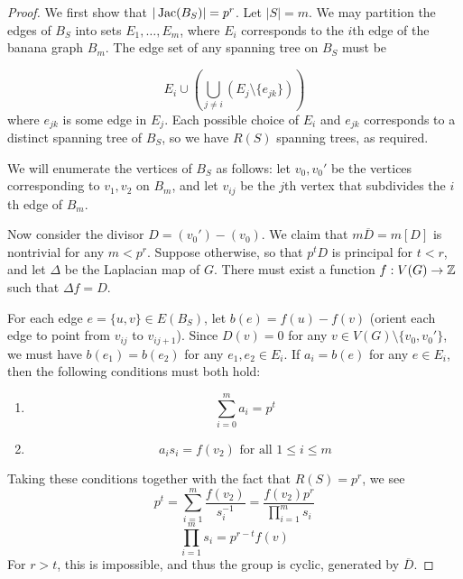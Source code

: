 \documentclass{amsart}
\begin{document}
\begin{proof}
  We first show that $|\operatorname{Jac}(B_S)| = p^r$. Let $|S| = m$. We may
  partition the edges of $B_S$ into sets $E_1, \ldots, E_m$, where
  $E_i$ corresponds to the $i$th edge of the banana graph $B_m$. The
  edge set of any spanning tree on $B_S$ must be

  \begin{equation*}
    E_i \cup \left(\bigcup_{j \ne i} (E_j \setminus \{e_{jk}\})\right)
  \end{equation*}
  where $e_{jk}$ is some edge in $E_j$. Each possible choice of $E_i$
  and $e_{jk}$ corresponds to a distinct spanning tree of $B_S$, so we
  have $R(S)$ spanning trees, as required.

  We will enumerate the vertices of $B_S$ as follows: let $v_0, v_0'$
  be the vertices corresponding to $v_1, v_2$ on $B_m$, and let
  $v_{ij}$ be the $j$th vertex that subdivides the $i$th edge of
  $B_m$.

  Now consider the divisor $D = (v_0') - (v_0)$. We claim that
  $m\overline{D} = m[D]$ is nontrivial for any $m < p^r$. Suppose
  otherwise, so that $p^tD$ is principal for $t < r$, and let $\Delta$
  be the Laplacian map of $G$. There must exist a function $f:V(G) \to
  \mathbb{Z}$ such that $\Delta f = D$.

  For each edge $e = \{u, v\} \in E(B_S)$, let $b(e) = f(u) - f(v)$
  (orient each edge to point from $v_{ij}$ to $v_{ij+1}$). Since $D(v)
  = 0$ for any $v \in V(G) \setminus \{v_0, v_0'\}$, we must have
  $b(e_1) = b(e_2)$ for any $e_1, e_2 \in E_i$.  If $a_i = b(e)$ for
  any $e \in E_i$, then the following conditions must both hold:
  
  \begin{enumerate}
    \item 
      \[
      \sum_{i=0}^m a_i = p^t
      \]
    \item
      \[
      a_is_i = f(v_2) \textrm{ for all } 1 \le i \le m
      \]
  \end{enumerate}

  Taking these conditions together with the fact that $R(S) = p^r$, we
  see
  \begin{equation*}
    p^t = \sum_{i=1}^m \frac{f(v_2)}{s_i^{-1}} = 
    \frac{f(v_2) p^r}{\prod_{i=1}^ms_i}
  \end{equation*}
  \begin{equation*}
    \prod_{i=1}^ms_i = p^{r-t}f(v)
  \end{equation*}
  For $r > t$, this is impossible, and thus the group is cyclic,
  generated by $\overline{D}$. 


\end{proof}
\end{document}
